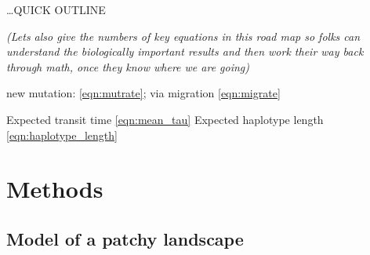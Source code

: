 \documentclass{article}
\newcommand{\gc}[1]{{\it\color{green}(#1)} }
\begin{document}
\dots QUICK OUTLINE

\gc{Lets also give the numbers of key equations in this road map so
  folks can understand the biologically important results and then work
  their way back through math, once they know where we are going}

  new mutation: \eqref{eqn:mutrate}; 
 via migration  \eqref{eqn:migrate}


Expected transit time \eqref{eqn:mean_tau}
Expected haplotype length \eqref{eqn:haplotype_length}









\section{Methods}

\subsection{Model of a patchy landscape}
\label{ss:patchyspace}
\end{document}
